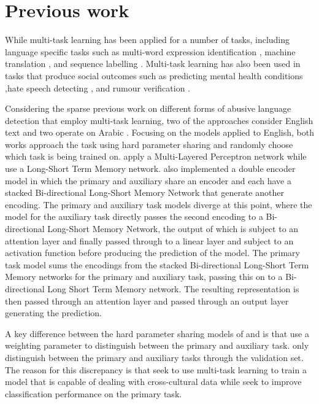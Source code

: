 \section{Previous work}

While multi-task learning has been applied for a number of tasks, including language specific tasks such as multi-word expression identification \cite{Bingel-Bjerva:2018}, machine translation \cite{Dong:2015}, and sequence labelling \cite{Rei:2017}. Multi-task learning has also been used in tasks that produce social outcomes such as predicting mental health conditions \cite{Benton:2017},hate speech detecting \cite{Waseem:2018,Rajamanickam:2020,Farha:2020,Djandji:2019}, and rumour verification \cite{Kochkina:2018}.

Considering the sparse previous work on different forms of abusive language detection that employ multi-task learning, two of the approaches consider English text \cite{Waseem:2018,Rajamanickam:2020} and two operate on Arabic \cite{Farha:2020,Djandji:2019}. Focusing on the models applied to English, both works approach the task using hard parameter sharing \cite{Caruana:1997} and randomly choose which task is being trained on. \citet{Waseem:2018} apply a Multi-Layered Perceptron network while \citet{Rajamanickam:2020} use a Long-Short Term Memory network. \citet{Rajamanickam:2020} also implemented a double encoder model in which the primary and auxiliary share an encoder and each have a stacked Bi-directional Long-Short Memory Network that generate another encoding. The primary and auxiliary task models diverge at this point, where the model for the auxiliary task directly passes the second encoding to a Bi-directional Long-Short Memory Network, the output of which is subject to an attention layer and finally passed through to a linear layer and subject to an activation function before producing the prediction of the model. The primary task model sums the encodings from the stacked Bi-directional Long-Short Term Memory networks for the primary and auxiliary task, passing this on to a Bi-directional Long Short Term Memory network. The resulting representation is then passed through an attention layer and passed through an output layer generating the prediction.

A key difference between the hard parameter sharing models of \citet{Waseem:2018} and \citet{Rajamanickam:2020} is that \citet{Rajamanickam:2020} use a weighting parameter to distinguish between the primary and auxiliary task. \citet{Waseem:2018} only distinguish between the primary and auxiliary tasks through the validation set. The reason for this discrepancy is that \citet{Waseem:2018} seek to use multi-task learning to train a model that is capable of dealing with cross-cultural data while \citet{Rajamanickam:2020} seek to improve classification performance on the primary task.

